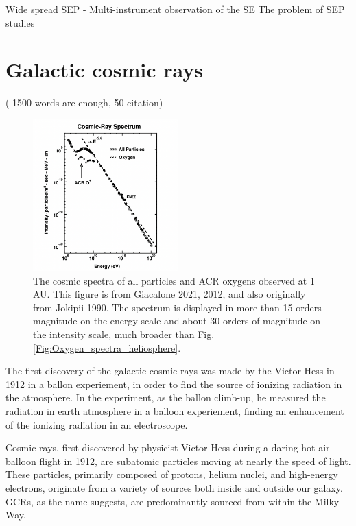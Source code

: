 Wide spread SEP
	- 
Multi-instrument observation of the SE
The problem of SEP studies



\section{Galactic cosmic rays} ( 1500 words are enough, 50 citation)

\begin{figure}
	\centering
	\includegraphics[width = 0.5\textwidth]{images/oxygen_cosmic-ray spectrum.png}
	
	\caption{The cosmic spectra of all particles and ACR oxygens observed at 1 AU. This figure is from Giacalone 2021, 2012, and also originally from Jokipii 1990.
	The spectrum is displayed in more than 15 orders magnitude on the energy scale and about 30 orders of magnitude on the intensity scale, much broader than Fig.\ref{Fig:Oxygen_spectra_heliosphere}.}
	\label{Fig:Oxygen_spectra_cosmic_ray}
\end{figure}

The first discovery of the galactic cosmic rays was made by the Victor Hess in 1912 in a ballon experiement, in order to find the source of ionizing radiation in the atmosphere. In the experiment, as the ballon climb-up, he measured the radiation in earth atmosphere in a balloon experiement, finding an enhancement of the ionizing radiation in an electroscope.  


Cosmic rays, first discovered by physicist Victor Hess during a daring hot-air balloon flight in 1912, are subatomic particles moving at nearly the speed of light. These particles, primarily composed of protons, helium nuclei, and high-energy electrons, originate from a variety of sources both inside and outside our galaxy. GCRs, as the name suggests, are predominantly sourced from within the Milky Way.




